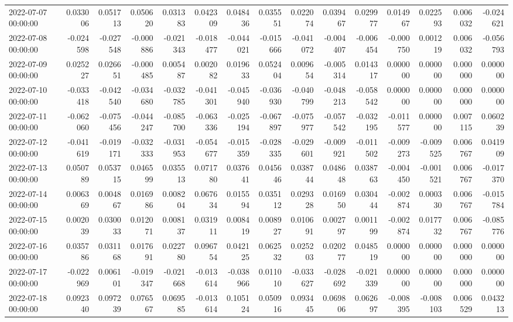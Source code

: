 \begin{tabular}{lrrrrrrrrrrrrrr}
2022-07-07 00:00:00 & 0.033006 & 0.051713 & 0.050620 & 0.031383 & 0.042309 & 0.048436 & 0.035551 & 0.022074 & 0.039467 & 0.029977 & 0.014967 & 0.022593 & 0.006032 & -0.024621 \\
2022-07-08 00:00:00 & -0.024598 & -0.027548 & -0.000886 & -0.021343 & -0.018477 & -0.044021 & -0.015666 & -0.041072 & -0.004407 & -0.006454 & -0.000750 & 0.001219 & 0.006032 & -0.056793 \\
2022-07-09 00:00:00 & 0.025227 & 0.026651 & -0.000485 & 0.005487 & 0.002082 & 0.019633 & 0.052404 & 0.009654 & -0.005314 & 0.014317 & 0.000000 & 0.000000 & 0.000000 & 0.000000 \\
2022-07-10 00:00:00 & -0.033418 & -0.042540 & -0.034680 & -0.032785 & -0.041301 & -0.045940 & -0.036930 & -0.040799 & -0.048213 & -0.058542 & 0.000000 & 0.000000 & 0.000000 & 0.000000 \\
2022-07-11 00:00:00 & -0.062060 & -0.075456 & -0.044247 & -0.085700 & -0.063336 & -0.025194 & -0.067897 & -0.075977 & -0.057542 & -0.032195 & -0.011577 & 0.000000 & 0.007115 & 0.060239 \\
2022-07-12 00:00:00 & -0.041619 & -0.019171 & -0.032333 & -0.031953 & -0.054677 & -0.015359 & -0.028335 & -0.029601 & -0.009921 & -0.011502 & -0.009273 & -0.009525 & 0.006767 & 0.041909 \\
2022-07-13 00:00:00 & 0.050789 & 0.053715 & 0.046599 & 0.035513 & 0.071780 & 0.037641 & 0.045646 & 0.038744 & 0.048648 & 0.038763 & -0.004450 & -0.001521 & 0.006767 & -0.017370 \\
2022-07-14 00:00:00 & 0.006369 & 0.004867 & 0.016986 & 0.008204 & 0.067634 & 0.015594 & 0.035112 & 0.029328 & 0.016950 & 0.030444 & -0.002874 & 0.000330 & 0.006767 & -0.015784 \\
2022-07-15 00:00:00 & 0.002039 & 0.030033 & 0.012071 & 0.008137 & 0.031911 & 0.008419 & 0.008927 & 0.010691 & 0.002797 & 0.001199 & -0.002874 & 0.017732 & 0.006767 & -0.085776 \\
2022-07-16 00:00:00 & 0.035786 & 0.031168 & 0.017691 & 0.022780 & 0.096754 & 0.042125 & 0.062532 & 0.025203 & 0.020277 & 0.048519 & 0.000000 & 0.000000 & 0.000000 & 0.000000 \\
2022-07-17 00:00:00 & -0.022969 & 0.006101 & -0.019347 & -0.021668 & -0.013614 & -0.038966 & 0.011010 & -0.033627 & -0.028692 & -0.021339 & 0.000000 & 0.000000 & 0.000000 & 0.000000 \\
2022-07-18 00:00:00 & 0.092340 & 0.097239 & 0.076567 & 0.069585 & -0.013614 & 0.105124 & 0.050916 & 0.093445 & 0.069806 & 0.062697 & -0.008395 & -0.008103 & 0.006529 & 0.043213 \\

\end{tabular}
